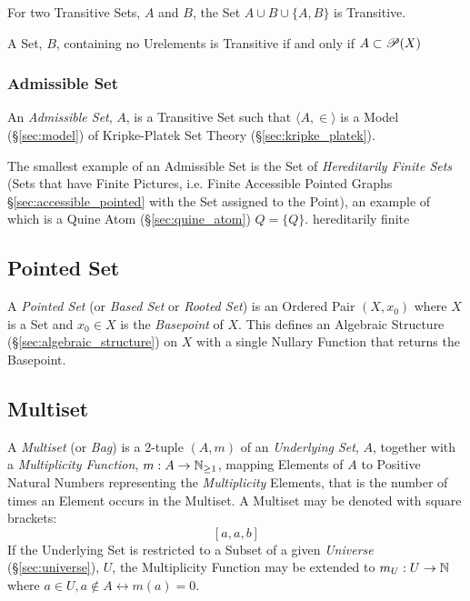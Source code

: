 For two Transitive Sets, $A$ and $B$, the Set $A \cup B \cup \{A,B\}$
is Transitive.

A Set, $B$, containing no Urelements is Transitive if and only if $A
\subset \mathscr{P}(X)$



\subsubsection{Admissible Set}\label{sec:admissible_set}

An \emph{Admissible Set}, $A$, is a Transitive Set such that $\langle
A, \in \rangle$ is a Model (\S\ref{sec:model}) of Kripke-Platek Set
Theory (\S\ref{sec:kripke_platek}).

The smallest example of an Admissible Set is the Set of
\emph{Hereditarily Finite Sets} (Sets that have Finite Pictures, i.e.
Finite Accessible Pointed Graphs \S\ref{sec:accessible_pointed} with
the Set assigned to the Point), an example of which is a Quine Atom
(\S\ref{sec:quine_atom}) $Q = \{Q\}$. \cite{aczel88} %
hereditarily finite



\subsection{Pointed Set}\label{sec:pointed_set}

A \emph{Pointed Set} (or \emph{Based Set} or \emph{Rooted Set}) is an
Ordered Pair $(X, x_0)$ where $X$ is a Set and $x_0 \in X$ is the
\emph{Basepoint} of $X$. This defines an Algebraic Structure
(\S\ref{sec:algebraic_structure}) on $X$ with a single Nullary
Function that returns the Basepoint.



\subsection{Multiset}\label{sec:multiset}

A \emph{Multiset} (or \emph{Bag}) is a 2-tuple $(A,m)$ of an
\emph{Underlying Set}, $A$, together with a \emph{Multiplicity
  Function}, $m : A \rightarrow \mathbb{N}_{\geq 1}$, mapping Elements
of $A$ to Positive Natural Numbers representing the
\emph{Multiplicity} Elements, that is the number of times an Element
occurs in the Multiset. A Multiset may be denoted with square
brackets:
\[
  [a,a,b]
\]
If the Underlying Set is restricted to a Subset of a given
\emph{Universe} (\S\ref{sec:universe}), $U$, the Multiplicity Function
may be extended to $m_U : U \rightarrow \mathbb{N}$ where $a \in U, a
\notin A \leftrightarrow m(a)=0$.

